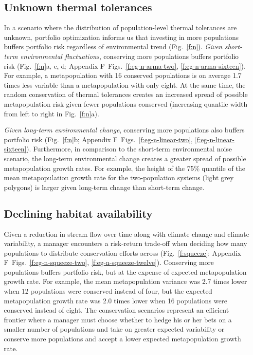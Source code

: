 \documentclass[12pt,english]{article}
\newcommand{\somts}{Appendix F}
\begin{document}
\begin{spacing}{1.9}
\subsection{Unknown thermal tolerances}\label{unknown-thermal-tolerances}

In a scenario where the distribution of population-level thermal tolerances are unknown, portfolio optimization informs us that investing in more populations buffers portfolio risk regardless of environmental trend (Fig.~\ref{f:n}). \emph{Given short-term environmental fluctuations}, conserving more populations buffers portfolio risk (Fig.~\ref{f:n}a, c, d; \somts~Figs.~\ref{f:eg-n-arma-two}, \ref{f:eg-n-arma-sixteen}). For example, a metapopulation with 16 conserved populations is on average 1.7 times less variable than a metapopulation with only eight. At the same time, the random conservation of thermal tolerances creates an increased spread of possible metapopulation risk given fewer populations conserved (increasing quantile width from left to right in Fig.~\ref{f:n}a).

\emph{Given long-term environmental change}, conserving more populations also buffers portfolio risk (Fig.~\ref{f:n}b; \somts~Figs.~\ref{f:eg-n-linear-two}, \ref{f:eg-n-linear-sixteen}). Furthermore, in comparison to the short-term environmental noise scenario, the long-term environmental change creates a greater spread of possible metapopulation growth rates. For example, the height of the 75\% quantile of the mean metapopulation growth rate for the two-population systems (light grey polygons) is larger given long-term change than short-term change.

\subsection{Declining habitat availability}\label{declining-habitat-availability}

Given a reduction in stream flow over time along with climate change and climate variability, a manager encounters a risk-return trade-off when deciding how many populations to distribute conservation efforts across (Fig.~\ref{f:squeeze}; \somts~Figs.~\ref{f:eg-n-squeeze-two}, \ref{f:eg-n-squeeze-twelve}). Conserving more populations buffers portfolio risk, but at the expense of expected metapopulation growth rate. For example, the mean metapopulation variance was 2.7 times lower when 12 populations were conserved instead of four, but the expected metapopulation growth rate was 2.0 times lower when 16 populations were conserved instead of eight. The conservation scenarios represent an efficient frontier where a manager must choose whether to hedge his or her bets on a smaller number of populations and take on greater expected variability or conserve more populations and accept a lower expected metapopulation growth rate.


\end{spacing}
\end{document}

